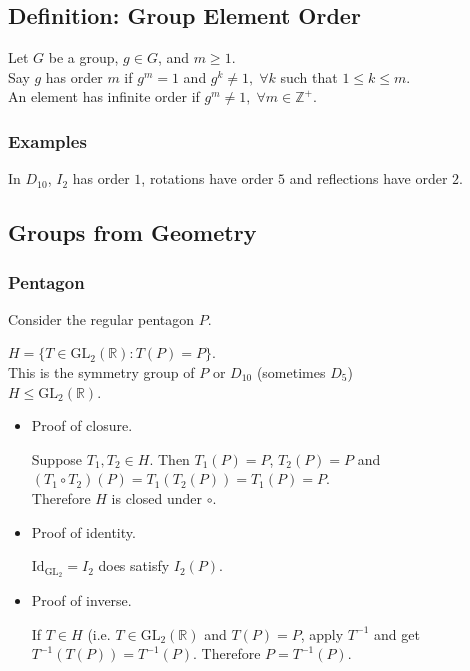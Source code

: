 \documentclass[11pt]{article}
\newcommand{\0}{\emptyset}
\newcommand{\Z}{\mathbb{Z}}
\newcommand{\R}{\mathbb{R}}
\begin{document}
\subsection*{Definition: Group Element Order}
\label{sec:org0ba637b}
Let \(G\) be a group, \(g\in G\), and \(m\geq 1\).\\[0pt]
Say \(g\) has order \(m\) if \(g^{m}=1\) and \(g^{k}\neq 1,\;\forall k\) such that \(1\leq k\leq m\).\\[0pt]
An element has infinite order if \(g^{m}\neq1,\;\forall m\in\Z^{+}\).\\[0pt]
\subsubsection*{Examples}
\label{sec:orga3dfa34}
In \(D_{10}\), \(I_{2}\) has order \(1\), rotations have order \(5\) and reflections have order \(2\).\\[0pt]
\subsection*{Groups from Geometry}
\label{sec:orga5309d2}
\subsubsection*{Pentagon}
\label{sec:org9dd487b}
Consider the regular pentagon \(P\).\\[0pt]


\(H=\{T\in\text{GL}_{2}(\R):T(P)=P\}\).\\[0pt]
This is the symmetry group of \(P\) or \(D_{10}\) (sometimes \(D_{5}\))\\[0pt]
\(H\leq\text{GL}_{2}(\R)\).\\[0pt]
\begin{itemize}
\item Proof of closure.
\label{sec:org9d91779}

Suppose \(T_{1},T_{2}\in H\). Then \(T_{1}(P)=P\), \(T_{2}(P)=P\) and \((T_{1}\circ T_{2})(P)=T_{1}(T_{2}(P))=T_{1}(P)=P\).\\[0pt]
Therefore \(H\) is closed under \(\circ\).\\[0pt]
\item Proof of identity.
\label{sec:orgaa50c30}

\(\text{Id}_{\text{GL}_{2}}=I_{2}\) does satisfy \(I_{2}(P)\).\\[0pt]
\item Proof of inverse.
\label{sec:orgf922976}

If \(T\in H\) (i.e. \(T\in\text{GL}_{2}(\R)\) and \(T(P)=P\), apply \(T^{-1}\) and get \(T^{-1}(T(P))=T^{-1}(P)\). Therefore \(P=T^{-1}(P)\).\\[0pt]
\end{itemize}
\end{document}
